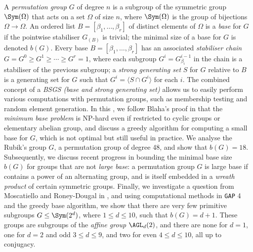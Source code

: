 A \textit{permutation group} $G$ of degree $n$ is a subgroup of the symmetric group $\Sym(\Omega)$ that acts on a set $\Omega$ of size $n$, where $\Sym(\Omega)$ is the group of bijections $\Omega \to \Omega$. An ordered list $B = [\beta_1,\dotsc,\beta_r]$ of distinct elements of $\Omega$ is a \textit{base} for $G$ if the pointwise stabiliser $G_{(B)}$ is trivial; the minimal size of a base for $G$ is denoted $b(G)$. Every base $B = [\beta_1,\dotsc,\beta_r]$ has an associated \textit{stabiliser chain} $G = G^0 \geq G^1 \geq \dotsb \geq G^r = 1$, where each subgroup $G^i = G^{i-1}_{\beta_i}$ in the chain is a stabiliser of the previous subgroup; a \textit{strong generating set} $S$ for $G$ relative to $B$ is a generating set for $G$ such that $G^i = \langle S \cap G^i \rangle$ for each $i$. The combined concept of a \textit{BSGS (base and strong generating set)} allows us to easily perform various computations with permutation groups, such as membership testing and random element generation. In this \thesis{}, we follow Blaha's proof in \cite{blaha1992} that the \textit{minimum base problem} is NP-hard even if restricted to cyclic groups or elementary abelian group, and discuss a greedy algorithm for computing a small base for $G$, which is not optimal but still useful in practice. We analyse the Rubik's group $G$, a permutation group of degree 48, and show that $b(G) = 18$. Subsequently, we discuss recent progress in bounding the minimal base size $b(G)$ for groups that are not \textit{large base}: a permutation group $G$ is large base if contains a power of an alternating group, and is itself embedded in a \textit{wreath product} of certain symmetric groups. Finally, we investigate a question from Moscatiello and Roney-Dougal in \cite{moscatiello_roney-dougal2021}, and using computational methods in \texttt{GAP} 4 and the greedy base algorithm, we show that there are very few primitive subgroups $G \leq \Sym(2^d)$, where $1 \leq d \leq 10$, such that $b(G) = d + 1$. These groups are subgroups of the \textit{affine group} $\AGL_d(2)$, and there are none for $d = 1$, one for $d = 2$ and odd $3 \leq d \leq 9$, and two for even $4 \leq d \leq 10$, all up to conjugacy.